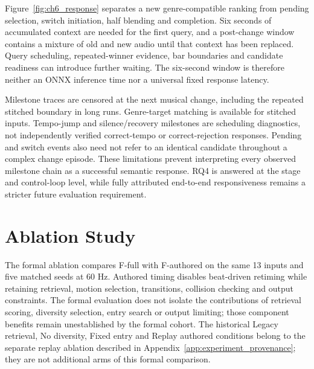 Figure~\ref{fig:ch6_response} separates a new genre-compatible ranking from
pending selection, switch initiation, half blending and completion. Six seconds
of accumulated context are needed for the first query, and a post-change window
contains a mixture of old and new audio until that context has been replaced.
Query scheduling, repeated-winner evidence, bar boundaries and candidate readiness
can introduce further waiting. The six-second window is therefore neither an
ONNX inference time nor a universal fixed response latency.

Milestone traces are censored at the next musical change, including the repeated
stitched boundary in long runs. Genre-target matching is available for stitched
inputs. Tempo-jump and silence/recovery milestones are scheduling diagnostics,
not independently verified correct-tempo or correct-rejection responses. Pending
and switch events also need not refer to an identical candidate throughout a
complex change episode. These limitations prevent interpreting every observed
milestone chain as a successful semantic response. RQ4 is answered at the stage
and control-loop level, while fully attributed end-to-end responsiveness remains
a stricter future evaluation requirement.

\section{Ablation Study}

The formal ablation compares F-full with F-authored on the same 13 inputs
and five matched seeds at 60 Hz. Authored timing disables
beat-driven retiming while retaining retrieval, motion selection, transitions,
collision checking and output constraints. The formal evaluation does not
isolate the contributions of retrieval scoring, diversity selection, entry
search or output limiting; those component benefits remain unestablished by
the formal cohort. The historical Legacy retrieval, No diversity, Fixed entry
and Replay authored conditions belong to the separate replay ablation described
in Appendix~\ref{app:experiment_provenance}; they are not additional arms of
this formal comparison.

\begin{table}[tb]
\centering\small

\caption{Formal 60 Hz timing ablation after source-level seed averaging.
Both rows compare F-authored with F-full; $\Delta$ is F-authored minus F-full.}
\label{tab:ch6_ablation}
\end{table}

